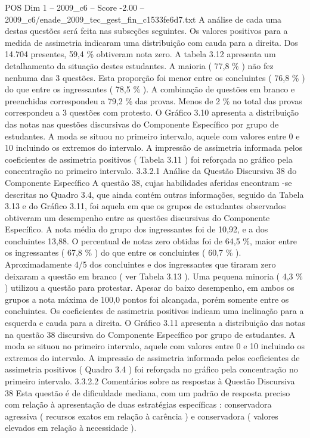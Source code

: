 \begin{textsample}{POS Dim 1 – 2009\_c6 – Score -2.00 – 2009\_c6/enade\_2009\_tec\_gest\_fin\_c1533fe6d7.txt}
A análise de cada uma destas questões será feita nas subseções seguintes.
Os valores positivos para a medida de assimetria indicaram uma distribuição com cauda para a direita.
Dos 14.704 presentes, 59,4 \% obtiveram nota zero.
A tabela 3.12 apresenta um detalhamento da situação destes estudantes.
A maioria ( 77,8 \% ) não fez nenhuma das 3 questões.
Esta proporção foi menor entre os concluintes ( 76,8 \% ) do que entre os ingressantes ( 78,5 \% ).
A combinação de questões em branco e preenchidas correspondeu a 79,2 \% das provas.
Menos de 2 \% no total das provas correspondeu a 3 questões com protesto.
O Gráfico 3.10 apresenta a distribuição das notas nas questões discursivas do Componente Específico por grupo de estudantes.
A moda se situou no primeiro intervalo, aquele com valores entre 0 e 10 incluindo os extremos do intervalo.
A impressão de assimetria informada pelos coeficientes de assimetria positivos ( Tabela 3.11 ) foi reforçada no gráfico pela concentração no primeiro intervalo. 3.3.2.1 Análise da Questão Discursiva 38 do Componente Específico A questão 38, cujas habilidades aferidas encontram -se descritas no Quadro 3.4, que ainda contém outras informações, seguido da Tabela 3.13 e do Gráfico 3.11, foi aquela em que os grupos de estudantes observados obtiveram um desempenho entre as questões discursivas do Componente Específico.
A nota média do grupo dos ingressantes foi de 10,92, e a dos concluintes 13,88.
O percentual de notas zero obtidas foi de 64,5 \%, maior entre os ingressantes ( 67,8 \% ) do que entre os concluintes ( 60,7 \% ).
Aproximadamente 4/5 dos concluintes e dos ingressantes que tiraram zero deixaram a questão em branco ( ver Tabela 3.13 ).
Uma pequena minoria ( 4,3 \% ) utilizou a questão para protestar.
Apesar do baixo desempenho, em ambos os grupos a nota máxima de 100,0 pontos foi alcançada, porém somente entre os concluintes.
Os coeficientes de assimetria positivos indicam uma inclinação para a esquerda e cauda para a direita.
O Gráfico 3.11 apresenta a distribuição das notas na questão 38 discursiva do Componente Específico por grupo de estudantes.
A moda se situou no primeiro intervalo, aquele com valores entre 0 e 10 incluindo os extremos do intervalo.
A impressão de assimetria informada pelos coeficientes de assimetria positivos ( Quadro 3.4 ) foi reforçada no gráfico pela concentração no primeiro intervalo. 3.3.2.2 Comentários sobre as respostas à Questão Discursiva 38 Esta questão é de dificuldade mediana, com um padrão de resposta preciso com relação à apresentação de duas estratégias específicas : conservadora agressiva ( recursos exatos em relação à carência ) e conservadora ( valores elevados em relação à necessidade ).

\end{textsample}
